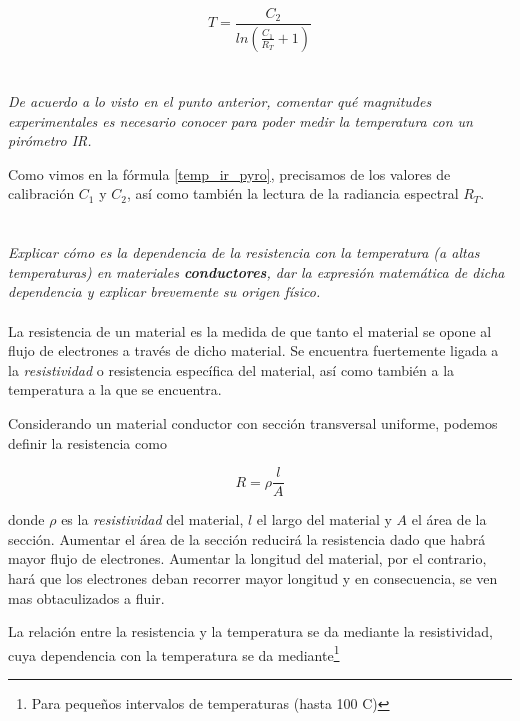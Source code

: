 \documentclass[12pt,a4paper]{article}
\begin{document}
			\begin{equation}\label{temp_ir_pyro}
				T = \frac{C_2}{ln\left( \frac{C_1}{R_T} + 1\right)}
			\end{equation}

	\section{}
		\textit{
		De acuerdo a lo visto en el punto anterior, comentar qué magnitudes experimentales es necesario conocer para poder medir la temperatura con un pirómetro IR.
		}

		Como vimos en la fórmula \ref{temp_ir_pyro}, precisamos de los valores de calibración $C_1$ y $C_2$, así como también la lectura de la radiancia espectral $R_T$.

	\section{}\label{item_f}
		\textit{
		Explicar cómo es la dependencia de la resistencia con la temperatura (a altas
		temperaturas) en materiales \textbf{conductores}, dar la expresión matemática de dicha
		dependencia y explicar brevemente su origen físico.
		}
		\\\\
		La resistencia de un material es la medida de que tanto el material se opone al flujo de electrones a través de dicho material. Se encuentra fuertemente ligada a la \textit{resistividad} o resistencia específica del material, así como también a la temperatura a la que se encuentra.

		Considerando un material conductor con sección transversal uniforme, podemos definir la resistencia como

		\begin{equation}\label{resistencia}
			R = \rho \frac{l}{A}
		\end{equation}

		donde $\rho$ es la \textit{resistividad} del material, $l$ el largo del material y $A$ el área de la sección. Aumentar el área de la sección reducirá la resistencia dado que habrá mayor flujo de electrones. Aumentar la longitud del material, por el contrario, hará que los electrones deban recorrer mayor longitud y en consecuencia, se ven mas obtaculizados a fluir.

		La relación entre la resistencia y la temperatura se da mediante la resistividad, cuya dependencia con la temperatura se da mediante\footnote{Para pequeños intervalos de temperaturas (hasta 100 \textdegree C)}
\end{document}
